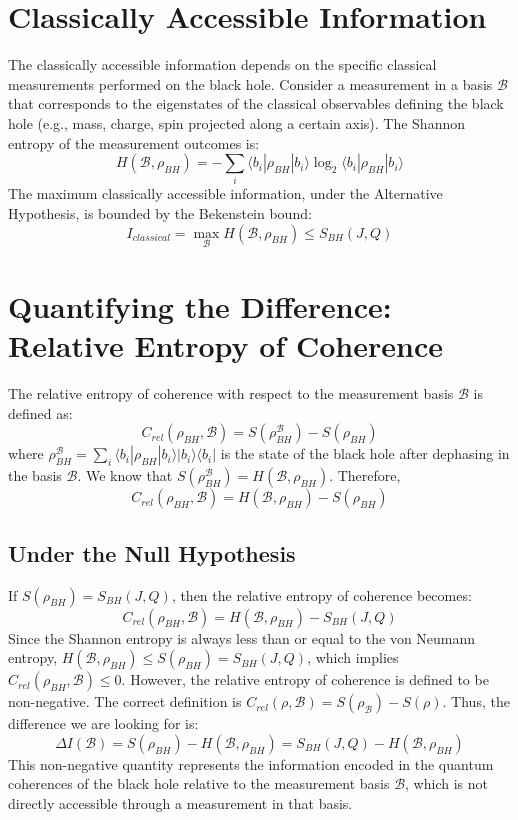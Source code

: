 \documentclass{article}
\theoremstyle{definition}
\begin{document}
	\section{Classically Accessible Information}
	
	The classically accessible information depends on the specific classical measurements performed on the black hole. Consider a measurement in a basis $\mathcal{B}$ that corresponds to the eigenstates of the classical observables defining the black hole (e.g., mass, charge, spin projected along a certain axis). The Shannon entropy of the measurement outcomes is:
	$$H(\mathcal{B}, \rho_{BH}) = -\sum_i \langle b_i|\rho_{BH}|b_i\rangle \log_2 \langle b_i|\rho_{BH}|b_i\rangle$$
	The maximum classically accessible information, under the Alternative Hypothesis, is bounded by the Bekenstein bound:
	$$I_{classical} = \max_{\mathcal{B}} H(\mathcal{B}, \rho_{BH}) \le S_{BH}(J, Q)$$
	
	\section{Quantifying the Difference: Relative Entropy of Coherence}
	
	The relative entropy of coherence with respect to the measurement basis $\mathcal{B}$ is defined as:
	$$C_{rel}(\rho_{BH}, \mathcal{B}) = S(\rho_{BH}^{\mathcal{B}}) - S(\rho_{BH})$$
	where $\rho_{BH}^{\mathcal{B}} = \sum_i \langle b_i|\rho_{BH}|b_i\rangle |b_i\rangle\langle b_i|$ is the state of the black hole after dephasing in the basis $\mathcal{B}$. We know that $S(\rho_{BH}^{\mathcal{B}}) = H(\mathcal{B}, \rho_{BH})$. Therefore,
	$$C_{rel}(\rho_{BH}, \mathcal{B}) = H(\mathcal{B}, \rho_{BH}) - S(\rho_{BH})$$
	
	\subsection{Under the Null Hypothesis}
	If $S(\rho_{BH}) = S_{BH}(J, Q)$, then the relative entropy of coherence becomes:
	$$C_{rel}(\rho_{BH}, \mathcal{B}) = H(\mathcal{B}, \rho_{BH}) - S_{BH}(J, Q)$$
	Since the Shannon entropy is always less than or equal to the von Neumann entropy, $H(\mathcal{B}, \rho_{BH}) \le S(\rho_{BH}) = S_{BH}(J, Q)$, which implies $C_{rel}(\rho_{BH}, \mathcal{B}) \le 0$. However, the relative entropy of coherence is defined to be non-negative. The correct definition is $C_{rel}(\rho, \mathcal{B}) = S(\rho_{\mathcal{B}}) - S(\rho)$. Thus, the difference we are looking for is:
	$$\Delta I(\mathcal{B}) = S(\rho_{BH}) - H(\mathcal{B}, \rho_{BH}) = S_{BH}(J, Q) - H(\mathcal{B}, \rho_{BH})$$
	This non-negative quantity represents the information encoded in the quantum coherences of the black hole relative to the measurement basis $\mathcal{B}$, which is not directly accessible through a measurement in that basis.
	
\end{document}
